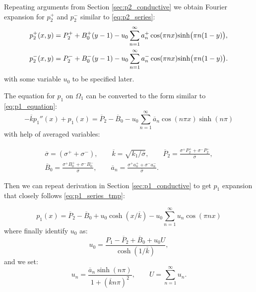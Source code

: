 \documentclass[a4paper,10pt]{article}
\def\ol#1{\overline{#1}}
\begin{document}
Repeating arguments from Section \ref{sec:p2_conductive} we obtain Fourier expansion for $p_2^+$ and $p_2^-$ similar to \eqref{eq:p2_series}:
\begin{align}
    \label{eq:p2_barrier_p}
    p_2^+(x,y) &= P_2^+ + B_0^+(y-1) - u_0\sum_{n=1}^\infty a_n^+ \cos(\pi n x) {\rm sinh} \big(\pi n(1-y)\big),\\ 
    \label{eq:p2_barrier_m}
    p_2^-(x,y) &= P_2^- + B_0^-(y-1) - u_0\sum_{n=1}^\infty a_n^- \cos(\pi n x) {\rm sinh} \big(\pi n(1-y)\big).
\end{align}
with some variable $u_0$ to be specified later.

The equation for $p_1$ on $\Omega_1$ can be converted to the form similar to \eqref{eq:p1_equation}:
\begin{equation}
    \label{eq:p1_barrier_equation}
    - \ol{k}  p_1''(x) + p_1(x) = \ol{P}_2 - \ol{B}_0 - u_0\sum_{n=1}^{\infty} \ol{a}_n \cos(n \pi x) \sinh(n \pi)
\end{equation}
with help of averaged variables:


\begin{gather*}
    \ol{\sigma} = (\sigma^+ + \sigma^-), \qquad
    \ol{k} = \sqrt{k_1/\ol{\sigma}}, \qquad
    \ol{P}_2 = \frac{\sigma^+ P_2^+ + \sigma^- P_2^-}{\ol{\sigma}}, \\
%    
    \ol{B}_0 = \frac{\sigma^+ B_0^+ + \sigma^- B_0^-}{\ol{\sigma}}, \qquad
    \ol{a}_n = \frac{\sigma^+ a_n^+ + \sigma^- a_n^-}{\ol{\sigma}}.  
\end{gather*}

Then we can repeat derivation in Section \ref{sec:p1_conductive} to get $p_1$ expansion that closely follows
\eqref{eq:p1_series_tmp}:

\begin{equation}
    \label{eq:barrier_p1_series}
    p_1(x) = \ol{P}_2 -  \ol{B}_0 + u_0 \cosh(x/\ol{k}) - u_0 \sum_{n=1}^\infty  u_n \cos(\pi n x) 
\end{equation}
where finally identify $u_0$ as:
\begin{equation}
    \label{eq:barrier_u0_def}    
    u_0 = \frac{P_1 - \ol{P}_2 + \ol{B}_0 + u_0 U}{\cosh(1/\ol{k})},
\end{equation}
and we set:
\begin{equation}
    \label{eq:barriaer_un}
    u_n = \frac{\ol{a}_n \sinh(n \pi)}{1 + (\ol{k} n \pi)^2}, \qquad
    U =  \sum_{n=1}^{\infty} u_n.
\end{equation}
\end{document}
